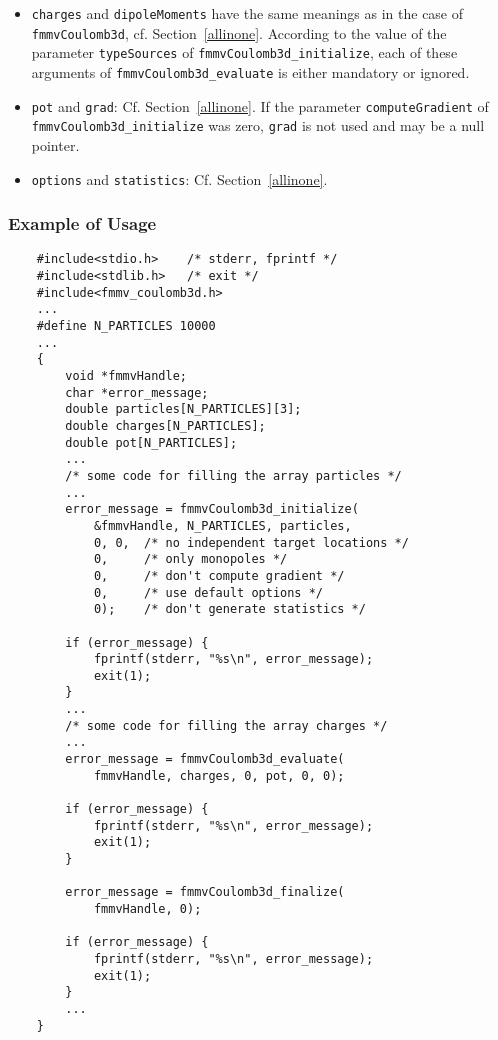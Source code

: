 \begin{itemize}
	\item \verb|charges| and \verb|dipoleMoments| have the same meanings
	as in the case of \verb|fmmvCoulomb3d|, cf. Section~\ref{allinone}. 
	According to the value of the parameter \verb|typeSources| of
	\verb|fmmvCoulomb3d_initialize|,
	each of these arguments of \verb|fmmvCoulomb3d_evaluate| 
	 is either mandatory or ignored. 
	 
	\item \verb|pot| and \verb|grad|: Cf. Section~\ref{allinone}. If
	the parameter \verb|computeGradient| of \verb|fmmvCoulomb3d_initialize|
	was zero, \verb|grad| is not used and may be a null pointer.
	
	\item \verb|options| and \verb|statistics|: Cf. Section~\ref{allinone}.	
\end{itemize}

\subsubsection*{Example of Usage}
\begin{verbatim}
    #include<stdio.h>    /* stderr, fprintf */
    #include<stdlib.h>   /* exit */
    #include<fmmv_coulomb3d.h>
    ...
    #define N_PARTICLES 10000
    ...
    {
        void *fmmvHandle;
        char *error_message;
        double particles[N_PARTICLES][3];
        double charges[N_PARTICLES];
        double pot[N_PARTICLES];
        ...
        /* some code for filling the array particles */
        ...
        error_message = fmmvCoulomb3d_initialize(
            &fmmvHandle, N_PARTICLES, particles,
            0, 0,  /* no independent target locations */
            0,     /* only monopoles */
            0,     /* don't compute gradient */		
            0,     /* use default options */
            0);    /* don't generate statistics */

        if (error_message) {
            fprintf(stderr, "%s\n", error_message);
            exit(1);
        }	
        ...
        /* some code for filling the array charges */
        ...
        error_message = fmmvCoulomb3d_evaluate( 
            fmmvHandle, charges, 0, pot, 0, 0);	
	    
        if (error_message) {
            fprintf(stderr, "%s\n", error_message);
            exit(1);
        }	

        error_message = fmmvCoulomb3d_finalize(
            fmmvHandle, 0);
	
        if (error_message) {
            fprintf(stderr, "%s\n", error_message);
            exit(1);
        }	
        ...
    }
\end{verbatim}


